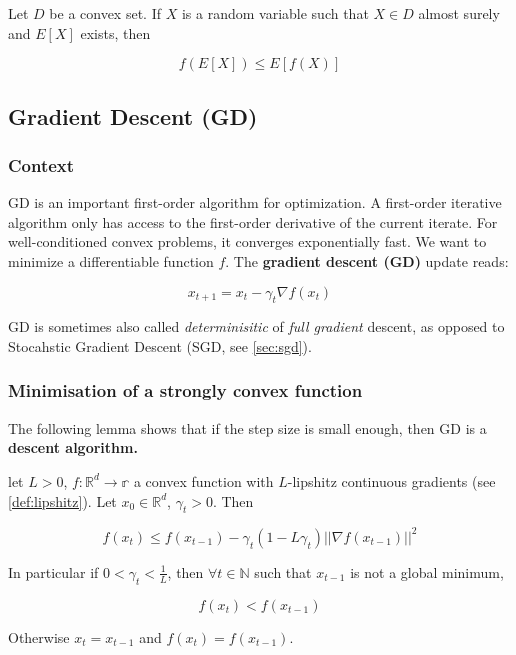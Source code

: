 \documentclass[
10pt, %
a4paper, %
oneside, %
headinclude,footinclude, %
BCOR5mm, %
]{scrartcl}
\begin{document}
Let $D$ be a convex set. If $X$ is a random variable such that $ X\in D$ almost surely and $ E[X]$ exists, then

\begin{equation*}
    f(E[X])\leq E[f(X)]
\end{equation*}

\subsection{\large\color{MidnightBlue}Gradient Descent (GD)}

\subsubsection{\large\color{Periwinkle}Context}

GD is an important first-order algorithm for optimization. A first-order iterative algorithm only has access to the first-order derivative of the current iterate. For well-conditioned convex problems, it converges exponentially fast. We want to minimize a differentiable function $f$. The \textbf{{gradient descent (GD)}}  update reads:

\begin{equation*}
    x_{t+1} = x_t - \gamma_t \nabla f(x_t)
\end{equation*}

GD is sometimes also called \textit{{determinisitic}} of \textit{{full
gradient}} descent, as opposed to Stocahstic Gradient Descent (SGD, see \ref{sec:sgd}).

\subsubsection{\large\color{Periwinkle}Minimisation of a strongly convex function}

The following lemma shows that if the step size is small enough, then GD is a \textbf{{descent algorithm.}} 

\begin{lemma}
    let $L>0$, $f: \mathbb{R}^d\rightarrow \mathbb{r} $ a convex function with $L$-lipshitz continuous gradients (see \ref{def:lipshitz}). Let $x_0\in \mathbb{R}^d$, $\gamma_t >0$. Then

    \begin{equation*}
	f(x_t)\leq f(x_{t-1})-\gamma_t (1-L\gamma_t) ||\nabla f(x_{t-1})||^2
    \end{equation*}

    In particular if $0<  \gamma_t < \frac{1}{L} $, then $ \forall t\in \mathbb{N} $ such that $ x_{t-1}$ is not a global minimum,

    \begin{equation*}
	f(x_t)<f(x_{t-1})
    \end{equation*}

    Otherwise $x_t = x_{t-1}$ and $f(x_t) = f(x_{t-1})$.
\end{lemma}
\end{document}
